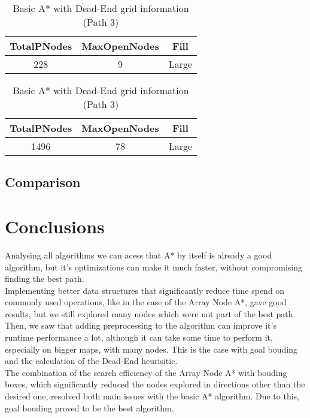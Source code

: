 \documentclass{article}
\begin{document}
  \begin{table}[h!]
    \parbox{.45\linewidth}{
        \centering
        \caption{NodeArray A* with Goal Bounding grid information (Path 2)}
        \label{tab:tableDeadEndGrid2}
        \begin{tabular}{c|c|c}
          \textbf{TotalPNodes} & \textbf{MaxOpenNodes} & \textbf{Fill}\\
          \hline
          228 & 9 & Large\\
        \end{tabular}
    }
    \hfil
    \parbox{.45\linewidth}{
        \centering
        \caption{Basic A* with Dead-End grid information (Path 3)}
        \label{tab:tableDeadEndGrid3}
        \begin{tabular}{c|c|c}
          \textbf{TotalPNodes} & \textbf{MaxOpenNodes} & \textbf{Fill}\\
          \hline
          1496 & 78 & Large\\
        \end{tabular}
    }
  \end{table}

  \subsection{Comparison}


  \section{Conclusions}
  Analysing all algorithms we can acess that A* by itself is already a good algorithm, but it's optimizations can make it much faster, 
  without compromising finding the best path.\\
  Implementing better data structures that significantly reduce time spend on commonly used operations, like in the case of the Array Node A*, 
  gave good results, but we still explored many nodes which were not part of the best path.\\
  Then, we saw that adding preprocessing to the algorithm can improve it's runtime performance a lot, although it can take some time to perform it, 
  especially on bigger maps, with many nodes. This is the case with goal bouding and the calculation of the Dead-End heurisitic.\\
  The combination of the search efficiency of the Array Node A* with bouding boxes, which significantly reduced the nodes explored 
  in directions other than the desired one, resolved both main issues with the basic A* algorithm. Due to this, goal bouding proved to be the best algorithm.
\end{document}
